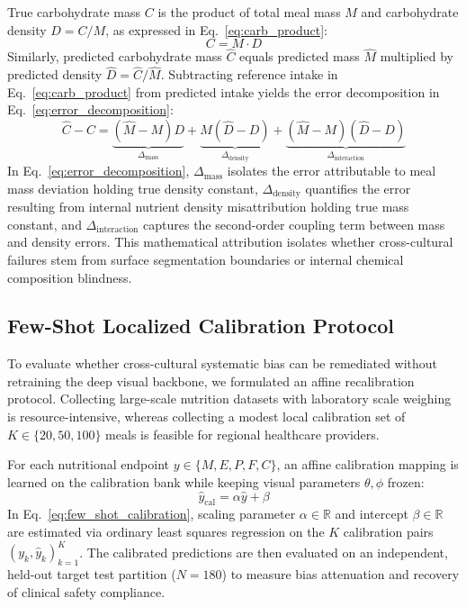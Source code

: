 \documentclass[utf8]{FrontiersinVancouver}
\begin{document}
True carbohydrate mass $C$ is the product of total meal mass $M$ and carbohydrate density $D = C / M$, as expressed in Eq.~\ref{eq:carb_product}:
\begin{equation}
    \label{eq:carb_product}
    C = M \cdot D
\end{equation}
Similarly, predicted carbohydrate mass $\hat{C}$ equals predicted mass $\hat{M}$ multiplied by predicted density $\hat{D} = \hat{C} / \hat{M}$. Subtracting reference intake in Eq.~\ref{eq:carb_product} from predicted intake yields the error decomposition in Eq.~\ref{eq:error_decomposition}:
\begin{equation}
    \label{eq:error_decomposition}
    \hat{C} - C = \underbrace{(\hat{M} - M) D}_{\Delta_{\text{mass}}} + \underbrace{M (\hat{D} - D)}_{\Delta_{\text{density}}} + \underbrace{(\hat{M} - M)(\hat{D} - D)}_{\Delta_{\text{interaction}}}
\end{equation}
In Eq.~\ref{eq:error_decomposition}, $\Delta_{\text{mass}}$ isolates the error attributable to meal mass deviation holding true density constant, $\Delta_{\text{density}}$ quantifies the error resulting from internal nutrient density misattribution holding true mass constant, and $\Delta_{\text{interaction}}$ captures the second-order coupling term between mass and density errors. This mathematical attribution isolates whether cross-cultural failures stem from surface segmentation boundaries or internal chemical composition blindness.

\subsection{Few-Shot Localized Calibration Protocol}

To evaluate whether cross-cultural systematic bias can be remediated without retraining the deep visual backbone, we formulated an affine recalibration protocol. Collecting large-scale nutrition datasets with laboratory scale weighing is resource-intensive, whereas collecting a modest local calibration set of $K \in \{20, 50, 100\}$ meals is feasible for regional healthcare providers.

For each nutritional endpoint $y \in \{M, E, P, F, C\}$, an affine calibration mapping is learned on the calibration bank while keeping visual parameters $\theta, \phi$ frozen:
\begin{equation}
    \label{eq:few_shot_calibration}
    \hat{y}_{\text{cal}} = \alpha \hat{y} + \beta
\end{equation}
In Eq.~\ref{eq:few_shot_calibration}, scaling parameter $\alpha \in \mathbb{R}$ and intercept $\beta \in \mathbb{R}$ are estimated via ordinary least squares regression on the $K$ calibration pairs $(y_k, \hat{y}_k)_{k=1}^K$. The calibrated predictions are then evaluated on an independent, held-out target test partition ($N=180$) to measure bias attenuation and recovery of clinical safety compliance.
\end{document}
